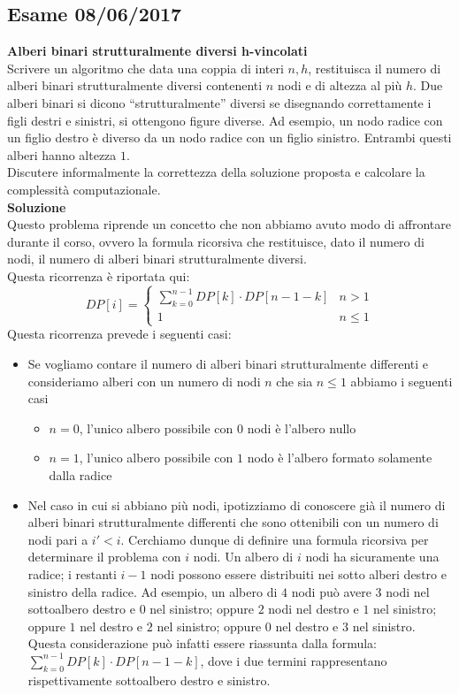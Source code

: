 \documentclass[../cheatSheetAlgoritmi.tex]{subfiles}
\begin{document}
\subsection{Esame 08/06/2017}
\textbf{Alberi binari strutturalmente diversi h-vincolati} \\
Scrivere un algoritmo che data una coppia di interi $n, h$, restituisca il numero di alberi binari strutturalmente diversi contenenti $n$ nodi e di altezza al più $h$. 
Due alberi binari si dicono “strutturalmente” diversi se disegnando correttamente i figli destri e sinistri, si ottengono figure diverse. 
Ad esempio, un nodo radice con un figlio destro è diverso da un nodo radice con un figlio sinistro. Entrambi questi alberi hanno altezza $1$. \\
Discutere informalmente la correttezza della soluzione proposta e calcolare la complessità computazionale. \\
\textbf{Soluzione} \\
Questo problema riprende un concetto che non abbiamo avuto modo di affrontare durante il corso, ovvero la formula ricorsiva che restituisce, dato il numero di nodi, il numero di alberi binari strutturalmente diversi. \\
Questa ricorrenza è riportata qui: 
\begin{equation*}
  	DP[i] =\begin{cases}
    	\sum_{k = 0}^{n - 1} DP[k] \cdot DP[n - 1 - k] & \text{$n > 1$}\\
    	1 & \text{$n \leq 1$}
  	\end{cases}
\end{equation*}
Questa ricorrenza prevede i seguenti casi: 
\begin{itemize}
	\item Se vogliamo contare il numero di alberi binari strutturalmente differenti e consideriamo alberi con un numero di nodi $n$ che sia $n\leq 1$ abbiamo i seguenti casi
	\begin{itemize}
		\item $n = 0$, l'unico albero possibile con $0$ nodi è l'albero nullo
		\item $n = 1$, l'unico albero possibile con $1$ nodo è l'albero formato solamente dalla radice
	\end{itemize}
	\item Nel caso in cui si abbiano più nodi, ipotizziamo di conoscere già il numero di alberi binari strutturalmente differenti che sono ottenibili con un numero di nodi pari a $i' < i$. Cerchiamo dunque di definire una formula ricorsiva per determinare il problema con $i$ nodi.  Un albero di $i$ nodi ha sicuramente una radice; i restanti $i-1$ nodi possono essere distribuiti nei sotto alberi destro e sinistro della radice. Ad esempio, un albero di $4$ nodi può avere $3$ nodi nel sottoalbero destro e $0$ nel sinistro; oppure $2$ nodi nel destro e $1$ nel sinistro; oppure $1$ nel destro e $2$ nel sinistro; oppure $0$ nel destro e $3$ nel sinistro. Questa considerazione può infatti essere riassunta dalla formula: $\sum_{k = 0}^{n - 1} DP[k] \cdot DP[n - 1 - k]$, dove i due termini rappresentano rispettivamente sottoalbero destro e sinistro.
\end{itemize}
\end{document}
